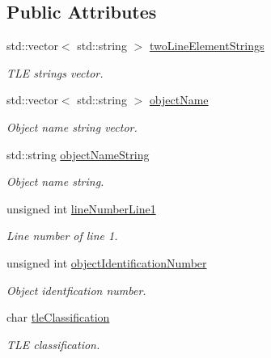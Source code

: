 \subsection*{Public Attributes}
\begin{DoxyCompactItemize}
\item 
std\+::vector$<$ std\+::string $>$ \hyperlink{structtudat_1_1input__output_1_1TwoLineElementData_acaacfe990d1e8cc5d6035c503354bae2}{two\+Line\+Element\+Strings}
\begin{DoxyCompactList}\small\item\em T\+LE strings vector. \end{DoxyCompactList}\item 
std\+::vector$<$ std\+::string $>$ \hyperlink{structtudat_1_1input__output_1_1TwoLineElementData_adaee5e323d5ad87b94539728ac234474}{object\+Name}
\begin{DoxyCompactList}\small\item\em Object name string vector. \end{DoxyCompactList}\item 
std\+::string \hyperlink{structtudat_1_1input__output_1_1TwoLineElementData_a0ed990433cffffef476dbc74ef24dd86}{object\+Name\+String}
\begin{DoxyCompactList}\small\item\em Object name string. \end{DoxyCompactList}\item 
unsigned int \hyperlink{structtudat_1_1input__output_1_1TwoLineElementData_a2b126f26169e05bb86bf0cec79a47827}{line\+Number\+Line1}
\begin{DoxyCompactList}\small\item\em Line number of line 1. \end{DoxyCompactList}\item 
unsigned int \hyperlink{structtudat_1_1input__output_1_1TwoLineElementData_ae4b58f77c8a356b14bee9e7a668f97ca}{object\+Identification\+Number}
\begin{DoxyCompactList}\small\item\em Object identfication number. \end{DoxyCompactList}\item 
char \hyperlink{structtudat_1_1input__output_1_1TwoLineElementData_a1109413866a443f71435c06e36f8f931}{tle\+Classification}
\begin{DoxyCompactList}\small\item\em T\+LE classification. \end{DoxyCompactList}\item 

\end{DoxyCompactItemize}
